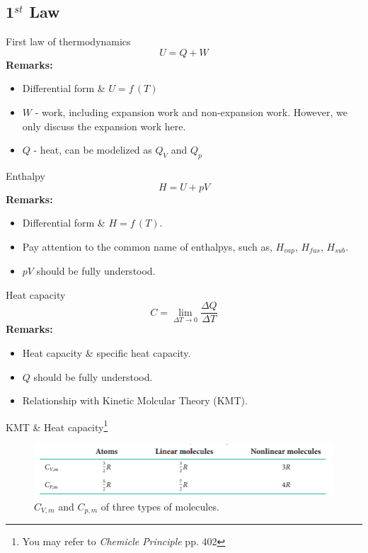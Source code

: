 \documentclass[12pt,compress]{beamer}
\begin{document}
\subsection{1$^{st}$ Law}
\begin{frame}{First law of thermodynamics}
    \begin{equation}
        U = Q + W
    \end{equation}
    \textbf{Remarks:}
    \begin{itemize}
        \item Differential form \& $U = f\,(T)$
        \item $W$ - work, including expansion work and non-expansion work. However, we only discuss the expansion work here.
        \item $Q$ - heat, can be modelized as $Q_V$ and $Q_p$
    \end{itemize}
\end{frame}
\begin{frame}{Enthalpy}
    \begin{equation}
        H = U + pV
    \end{equation}
    \textbf{Remarks:}
    \begin{itemize}
        \item Differential form \& $H = f\,(T)$.
        \item Pay attention to the common name of enthalpys, such as, $H_{vap}$, $H_{fus}$, $H_{sub}$.
        \item $pV$ should be fully understood.
    \end{itemize}
\end{frame}
\begin{frame}{Heat capacity}
    \begin{equation}
        C = \lim\limits_{\Delta T \rightarrow 0}\frac{\Delta Q}{\Delta T}
    \end{equation}
    \textbf{Remarks:}
    \begin{itemize}
        \item Heat capacity \& specific heat capacity.
        \item $Q$ should be fully understood.
        \item Relationship with Kinetic Molcular Theory (KMT).
    \end{itemize}
\end{frame}
\begin{frame}{KMT \& Heat capacity\footnote{\tiny{You may refer to \textit{Chemicle Principle} pp. 402}}}
    \begin{figure}[H]
        \centering
        \includegraphics[width=\textwidth]{KMT.png}
        \caption{$C_{V,m}$ and $C_{p,m}$ of three types of molecules.}
    \end{figure}
\end{frame}
\end{document}

